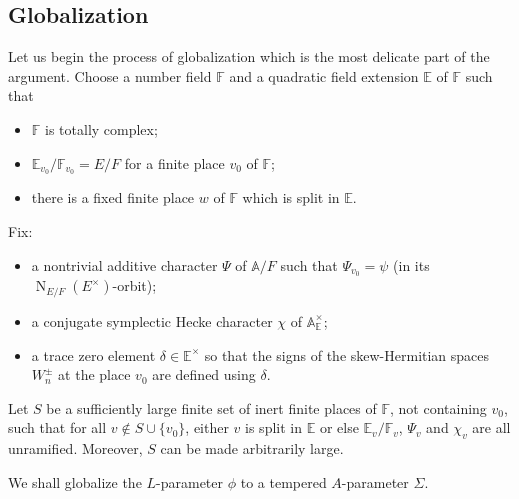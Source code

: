 \documentclass[11pt]{amsart}
\numberwithin{equation}{section}
\theoremstyle{plain}
\theoremstyle{definition}
\theoremstyle{remark}
\def\N{\operatorname{N}}
\def\AA{\mathbb{A}}
\def\EE{\mathbb{E}}
\def\FF{\mathbb{F}}
\begin{document}
\subsection{Globalization}

Let us begin the process of globalization which is the most delicate part of the argument. Choose a number field $\FF$ and a quadratic field extension $\EE$ of $\FF$ such that 
\begin{itemize}
\item $\FF$ is totally complex;
\item $\EE_{v_0} / \FF_{v_0}  = E/F$ for a finite place $v_0$ of $\FF$;
\item there is a fixed finite place $w$ of $\FF$ which is split in $\EE$. 
\end{itemize}
Fix:
\begin{itemize}
\item a nontrivial additive character $\Psi$ of $\AA / F$ such that $\Psi_{v_0}  = \psi$ (in its $\N_{E/F}(E^{\times})$-orbit);
\item a conjugate symplectic Hecke character $\chi$ of $\AA_{\EE}^{\times}$; 
\item a trace zero element $\delta \in \EE^{\times}$ so that the signs of the skew-Hermitian spaces $W_n^{\pm}$ at the place $v_0$ are defined using $\delta$.
\end{itemize}
Let $S$ be a sufficiently large finite set of inert finite places of $\FF$, not containing $v_0$, such that for all $v \notin S \cup \{ v_0 \}$, either $v$ is split in $\EE$ or else $\EE_v/\FF_v$, $\Psi_v$ and $\chi_v$ are all unramified. Moreover, $S$ can be made arbitrarily large.

We shall globalize the $L$-parameter $\phi$ to a tempered $A$-parameter $\Sigma$.
\end{document}
